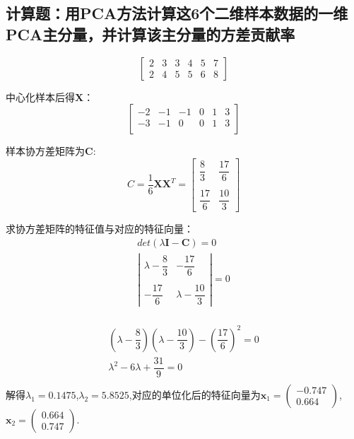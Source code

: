 \documentclass{ctexart}
\begin{document}
\subsection*{计算题：用PCA方法计算这6个二维样本数据的一维PCA主分量，并计算该主分量的方差贡献率}
\begin{equation*}
\begin{bmatrix}
2&3&3&4&5&7\\
2&4&5&5&6&8
\end{bmatrix}
\end{equation*}

中心化样本后得$\bm{X}$：
\begin{equation*}
\begin{bmatrix}
-2&-1&-1&0&1&3\\
-3&-1&0&0&1&3\\
\end{bmatrix}
\end{equation*}

样本协方差矩阵为$\bm{C}$:
\begin{equation*}
C=\frac{1}{6}\bm{X}\bm{X}^T=\begin{bmatrix}
\dfrac{8}{3}&\dfrac{17}{6}\\
&\\
\dfrac{17}{6}&\dfrac{10}{3}
\end{bmatrix}
\end{equation*}

求协方差矩阵的特征值与对应的特征向量：
\begin{gather*}
det(\lambda\bm{I}-\bm{C})=0\\
\left|\begin{matrix}
\lambda-\dfrac{8}{3}&-\dfrac{17}{6}\\
&\\
-\dfrac{17}{6}&\lambda-\dfrac{10}{3}
\end{matrix}\right|=0\\
\end{gather*}

\begin{gather*}
(\lambda-\dfrac{8}{3})(\lambda-\dfrac{10}{3})-\left(\dfrac{17}{6}\right)^2=0\\
\lambda^2-6\lambda+\dfrac{31}{9}=0\\
\end{gather*}
解得$\lambda_1=0.1475$,$\lambda_2= 5.8525$,对应的单位化后的特征向量为$\bm{x}_1=\left(\begin{array}{c}-0.747\\0.664\end{array}\right)$,$\bm{x}_2=\left(\begin{array}{c}0.664\\ 0.747\end{array}\right)$.
\end{document}
